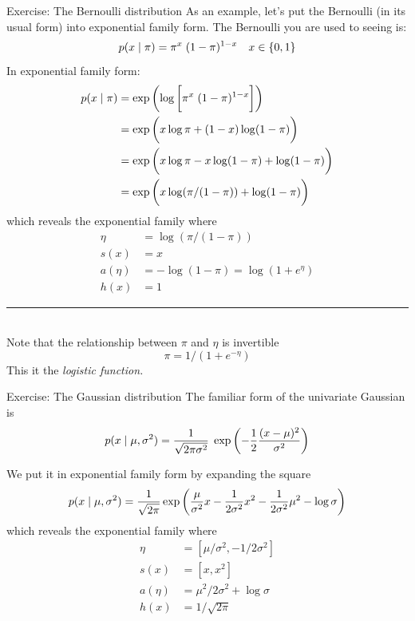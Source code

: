 \documentclass[10pt]{beamer}
\begin{document}
\begin{frame}{Exercise: The Bernoulli distribution}
\footnotesize
As an example, let's put the Bernoulli (in its usual form) into exponential family form.   The Bernoulli you are used to seeing is:
\[ p(x \; | \; \pi) = \pi^x \; (1-\pi)^{1-x} \quad x \in \{ {0,1} \} \] 
\pause
In exponential family form:
\begin{align*}
 p(x \; | \; \pi) &= \exp \bigg( {  \log \bigg[ {\pi^x \; (1-\pi)^{1-x} } \bigg]} \bigg) \\
 &= \exp \bigg( { x \log \pi + (1-x) \log (1-\pi)} \bigg) \\
 &= \exp \bigg( {x \log \pi - x \log (1-\pi) + \log (1-\pi)} \bigg) \\
&= \exp \bigg( {x \log (\pi/(1-\pi)) + \log (1-\pi) } \bigg) 
 \end{align*}
 which reveals the exponential family where
 \begin{align*}
\eta &= \log(\pi / (1-\pi) ) \\
s(x) &= x\\
a(\eta) &= -\log (1-\pi) = \log (1 + e^\eta) \\
h(x) &=  1
 \end{align*}
\noindent\rule{2cm}{.4pt} \\
\tiny  Note that the relationship between $\pi$ and $\eta$ is invertible
\[ \pi = 1/(1 + e^{-\eta})\] 
 This it the \it{logistic function}.


\end{frame}

\begin{frame}{Exercise: The Gaussian distribution}
\footnotesize
The familiar form of the univariate Gaussian is 
\[ p(x \; | \; \mu, \sigma^2) = \displaystyle\frac{1}{\sqrt{2 \pi \sigma^2}} \; \exp \bigg( { - \displaystyle\frac{1}{2} \displaystyle\frac{(x-\mu)^2}{\sigma^2}} \bigg)  \] 
\pause

We put it in exponential family form by expanding the square
\begin{align*}
 p(x \; | \; \mu, \sigma^2) = \displaystyle\frac{1}{\sqrt{2 \pi}} \exp \bigg( { \displaystyle\frac{\mu}{\sigma^2} x - \displaystyle\frac{1}{2 \sigma^2} x^2 - \displaystyle\frac{1}{2 \sigma^2} \mu^2 - \log \sigma} \bigg)
 \end{align*}
 which reveals the exponential family where
 \begin{align*}
\eta &= [\mu/\sigma^2, -1/2 \sigma^2 ]\\
s(x) &= [x, x^2] \\
a(\eta) &= \mu^2/2\sigma^2 + \log \sigma \\
h(x) &=  1/\sqrt{2 \pi}
 \end{align*}



\end{frame}
\end{document}
